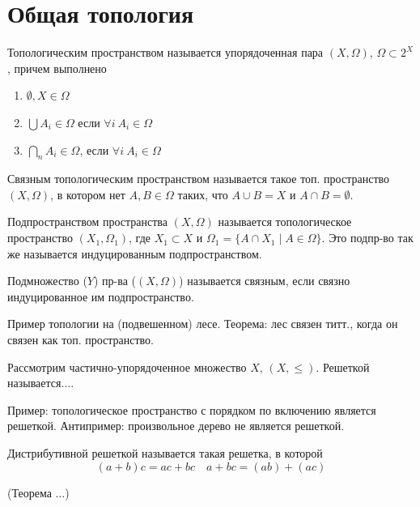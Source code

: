 \section{Общая топология}
\begin{definition}
    Топологическим пространством называется упорядоченная пара $(X, \Omega)$, $\Omega \subset 2^X$, причем выполнено 
    \begin{enumerate}
        \item $\emptyset, X \in \Omega$
        \item $\bigcup A_i \in \Omega$ если $\forall i\ A_i \in \Omega$
        \item $\bigcap_{n} A_i \in \Omega$, если $\forall i\ A_i \in \Omega$
    \end{enumerate}
\end{definition}

\begin{definition}
    Связным топологическим пространством называется такое топ. пространство $(X, \Omega)$, в котором нет $A,B \in \Omega$ таких, что $A \cup B = X$ и $A \cap B = \emptyset$.
\end{definition}

\begin{definition}
    Подпространством пространства $(X, \Omega)$ называется топологическое пространство $(X_1, \Omega_1)$, где $X_1 \subset X$ и $\Omega_1 =\{A \cap X_1 \mid A \in \Omega \}$.
    Это подпр-во так же называется индуцированным подпространством.
\end{definition}

\begin{definition}
    Подмножество ($Y$) пр-ва ($(X, \Omega)$) называется связным, если связно индуцированное им подпространство.
\end{definition}

Пример топологии на (подвешенном) лесе.
Теорема: лес связен титт., когда он связен как топ. пространство.

\begin{definition}
    Рассмотрим частично-упорядоченное множество $X$, $(X, \leqslant)$.
    Решеткой называется$\ldots$. 
\end{definition}

Пример: топологическое пространство с порядком по включению является решеткой.
Антипример: произвольное дерево не является решеткой.
\begin{definition}
    Дистрибутивной решеткой называется такая решетка, в которой 
    \[(a+b)c = ac + bc \quad a + bc = (ab)+(ac)  \] 
\end{definition}
(Теорема $\ldots$)

